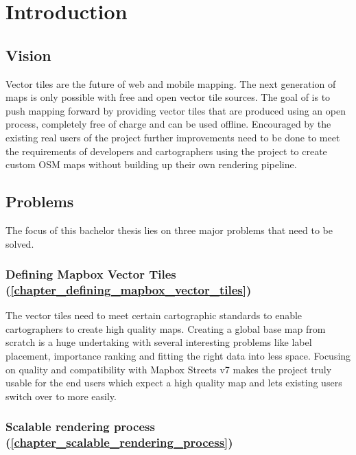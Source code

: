 \chapter{Introduction}

\section{Vision}\label{part1_vision}

Vector tiles are the future of web and mobile mapping. The next generation of maps is only possible
with free and open vector tile sources. The goal of \osmvt{} is to push mapping forward by providing
vector tiles that are produced using an open process, completely free of charge and can be used offline.
Encouraged by the existing real users of the project further improvements need to be done to meet the requirements of developers and cartographers using the project to create custom OSM maps without building up their own rendering pipeline.


\section{Problems}\label{goals}

The focus of this bachelor thesis lies on three major problems that need to be solved.

\subsection*{Defining Mapbox Vector Tiles (\autoref{chapter_defining_mapbox_vector_tiles})}\label{intro_carto_standards}

 The vector tiles need to meet certain cartographic standards to enable cartographers to create high quality maps. Creating a global base map from scratch is a huge undertaking with several interesting problems like label placement, importance ranking and fitting the right data into less space. Focusing on quality and compatibility with Mapbox Streets v7 makes the project truly usable for the end users which expect a high quality map and lets existing users switch over to \osmvt{} more easily.

\subsection*{Scalable rendering process (\autoref{chapter_scalable_rendering_process})}\label{scalable-rendering-process}

